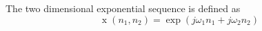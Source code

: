 The two dimensional exponential sequence is defined as
$$\operatorname{x}(n_1, n_2) = \exp(j \omega_1 n_1 + j \omega_2 n_2)$$
